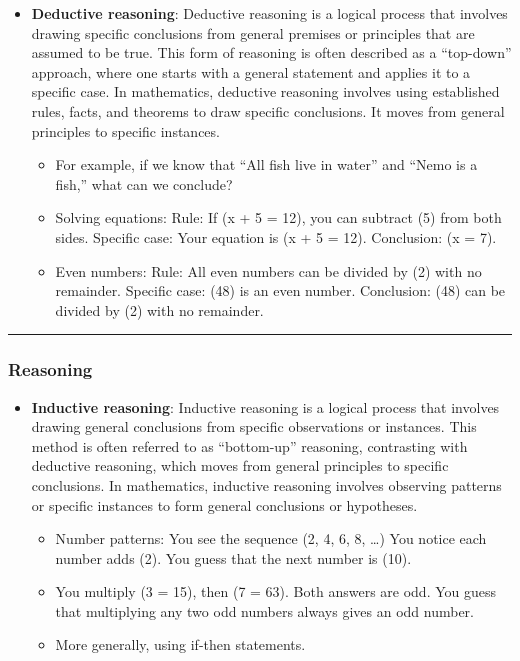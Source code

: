 \documentclass[
  letterpaper,
  DIV=11,
  numbers=noendperiod]{scrartcl}
\begin{document}
\begin{itemize}
\item
  \textbf{Deductive reasoning}: Deductive reasoning is a logical process
  that involves drawing specific conclusions from general premises or
  principles that are assumed to be true. This form of reasoning is
  often described as a ``top-down'' approach, where one starts with a
  general statement and applies it to a specific case. In mathematics,
  deductive reasoning involves using established rules, facts, and
  theorems to draw specific conclusions. It moves from general
  principles to specific instances.

  \begin{itemize}
  \item
    For example, if we know that ``All fish live in water'' and ``Nemo
    is a fish,'' what can we conclude?
  \item
    Solving equations: Rule: If (x + 5 = 12), you can subtract (5) from
    both sides. Specific case: Your equation is (x + 5 = 12).
    Conclusion: (x = 7).
  \item
    Even numbers: Rule: All even numbers can be divided by (2) with no
    remainder. Specific case: (48) is an even number. Conclusion: (48)
    can be divided by (2) with no remainder.
  \end{itemize}
\end{itemize}

\begin{center}\rule{0.5\linewidth}{0.5pt}\end{center}

\subsubsection{Reasoning}\label{reasoning-1}

\begin{itemize}
\item
  \textbf{Inductive reasoning}: Inductive reasoning is a logical process
  that involves drawing general conclusions from specific observations
  or instances. This method is often referred to as ``bottom-up''
  reasoning, contrasting with deductive reasoning, which moves from
  general principles to specific conclusions. In mathematics, inductive
  reasoning involves observing patterns or specific instances to form
  general conclusions or hypotheses.

  \begin{itemize}
  \item
    Number patterns: You see the sequence (2, 4, 6, 8, \dots) You notice
    each number adds (2). You guess that the next number is (10).
  \item
    You multiply (3  = 15), then (7  = 63). Both answers
    are odd. You guess that multiplying any two odd numbers always gives
    an odd number.
  \item
    More generally, using if-then statements.
  \end{itemize}
\end{itemize}
\end{document}
